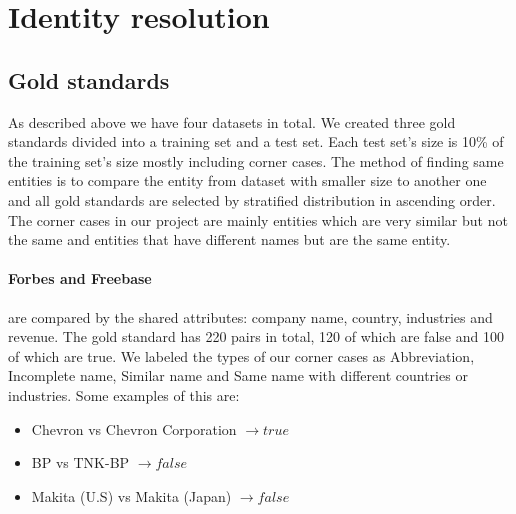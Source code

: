 \section{Identity resolution}
\subsection{Gold standards}
As described above we have four datasets in total. We created three gold standards divided into a training set and a test set. Each test set's size is 10\% of the training set's size mostly including corner cases. The method of finding same entities is to compare the entity from dataset with smaller size to another one and all gold standards are selected by stratified distribution in ascending order. The corner cases in our project are mainly entities which are very similar but not the same and entities that have different names but are the same entity.
\paragraph{Forbes and Freebase} are compared by the shared attributes: company name, country, industries and revenue. The gold standard has 220 pairs in total, 120 of which are false and 100 of which are true. We labeled the types of our corner cases as Abbreviation, Incomplete name, Similar name and Same name with different countries or industries. Some examples of this are:
\begin{itemize}[noitemsep,topsep=0pt,parsep=0pt,partopsep=0pt]
\item Chevron vs Chevron Corporation $\longrightarrow true$
\item BP vs TNK-BP $\longrightarrow false$ 
\item Makita (U.S) vs Makita (Japan) $\longrightarrow false$
\end{itemize}


